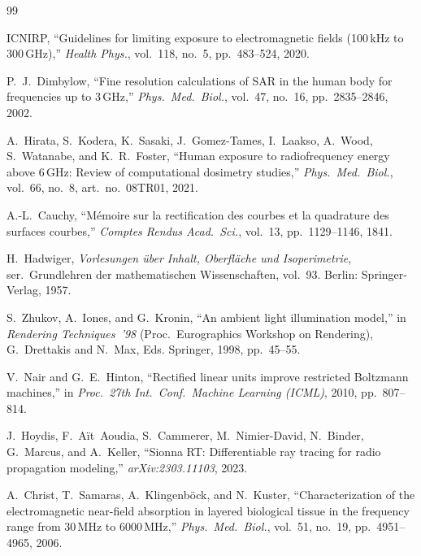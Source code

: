 \documentclass[11pt,a4paper]{article}
\theoremstyle{definition}      %
\begin{document}
\begingroup
\raggedright
\begin{thebibliography}{99}

  {ICNIRP}, ``Guidelines for limiting exposure to electromagnetic fields
  (100\,kHz to 300\,GHz),'' \textit{Health Phys.}, vol.~118, no.~5,
  pp.~483--524, 2020.

  P.~J.~Dimbylow, ``Fine resolution calculations of SAR in the human body
  for frequencies up to 3\,GHz,'' \textit{Phys.\ Med.\ Biol.}, vol.~47,
  no.~16, pp.~2835--2846, 2002.

  A.~Hirata, S.~Kodera, K.~Sasaki, J.~Gomez-Tames, I.~Laakso, A.~Wood,
  S.~Watanabe, and K.~R.~Foster, ``Human exposure to radiofrequency energy
  above 6\,GHz: Review of computational dosimetry studies,''
  \textit{Phys.\ Med.\ Biol.}, vol.~66, no.~8, art.~no.~08TR01, 2021.

  A.-L.~Cauchy, ``M\'{e}moire sur la rectification des courbes et la
  quadrature des surfaces courbes,'' \textit{Comptes Rendus Acad.\ Sci.},
  vol.~13, pp.~1129--1146, 1841.

  H.~Hadwiger, \textit{Vorlesungen \"{u}ber Inhalt, Oberfl\"{a}che und
  Isoperimetrie}, ser.\ Grundlehren der mathematischen Wissenschaften,
  vol.~93. Berlin: Springer-Verlag, 1957.

  S.~Zhukov, A.~Iones, and G.~Kronin, ``An ambient light illumination
  model,'' in \textit{Rendering Techniques~'98} (Proc.\ Eurographics
  Workshop on Rendering), G.~Drettakis and N.~Max, Eds. Springer, 1998,
  pp.~45--55.

  V.~Nair and G.~E.~Hinton, ``Rectified linear units improve restricted
  Boltzmann machines,'' in \textit{Proc.\ 27th Int.\ Conf.\ Machine
  Learning (ICML)}, 2010, pp.~807--814.

  J.~Hoydis, F.~A\"{i}t~Aoudia, S.~Cammerer, M.~Nimier-David, N.~Binder,
  G.~Marcus, and A.~Keller, ``{Sionna RT}: Differentiable ray tracing for
  radio propagation modeling,'' \textit{arXiv:2303.11103}, 2023.

  A.~Christ, T.~Samaras, A.~Klingenb\"{o}ck, and N.~Kuster,
  ``Characterization of the electromagnetic near-field absorption in layered
  biological tissue in the frequency range from 30\,MHz to 6000\,MHz,''
  \textit{Phys.\ Med.\ Biol.}, vol.~51, no.~19, pp.~4951--4965, 2006.


\end{thebibliography}
\end{document}

